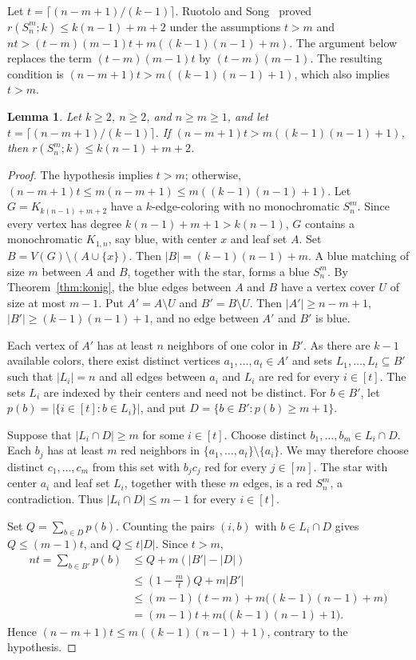 \documentclass[11pt]{article}
\newtheorem{lemma}[theorem]{Lemma}
\theoremstyle{definition}
\theoremstyle{remark}
\begin{document}
Let \(t=\lceil(n-m+1)/(k-1)\rceil\). Ruotolo and
Song~\cite[Theorem~3.3]{RuotoloSong} proved
\(r(S_n^m;k)\le k(n-1)+m+2\) under the assumptions \(t>m\)
and \(nt>(t-m)(m-1)t+m((k-1)(n-1)+m)\).
The argument below replaces the term \((t-m)(m-1)t\) by
\((t-m)(m-1)\). The resulting condition is
\((n-m+1)t>m((k-1)(n-1)+1)\), which also implies \(t>m\).

\begin{lemma}\label{lem:subdivided-upper}
Let \(k\ge2\), \(n\ge2\), and \(n\ge m\ge1\), and let
\(t=\lceil(n-m+1)/(k-1)\rceil\). If
\((n-m+1)t>m((k-1)(n-1)+1)\), then
\(r(S_n^m;k)\le k(n-1)+m+2\).
\end{lemma}

\begin{proof}
The hypothesis implies \(t>m\); otherwise,
\((n-m+1)t\le m(n-m+1)\le m((k-1)(n-1)+1)\).
Let \(G=K_{k(n-1)+m+2}\) have a \(k\)-edge-coloring with no
monochromatic \(S_n^m\). Since every vertex has degree
\(k(n-1)+m+1>k(n-1)\), \(G\) contains a monochromatic
\(K_{1,n}\), say blue, with center \(x\) and leaf set \(A\).
Set \(B=V(G)\setminus(A\cup\{x\})\). Then
\(|B|=(k-1)(n-1)+m\). A blue matching of size \(m\) between
\(A\) and \(B\), together with the star, forms a blue \(S_n^m\).
By Theorem~\ref{thm:konig}, the blue edges between \(A\) and \(B\)
have a vertex cover \(U\) of size at most \(m-1\). Put
\(A'=A\setminus U\) and \(B'=B\setminus U\). Then
\(|A'|\ge n-m+1\), \(|B'|\ge(k-1)(n-1)+1\), and no edge
between \(A'\) and \(B'\) is blue.

Each vertex of \(A'\) has at least \(n\) neighbors of one color
in \(B'\). As there are \(k-1\) available colors, there exist
distinct vertices \(a_1,\ldots,a_t\in A'\) and sets
\(L_1,\ldots,L_t\subseteq B'\) such that \(|L_i|=n\) and all
edges between \(a_i\) and \(L_i\) are red for every \(i\in[t]\).
The sets \(L_i\) are indexed by their centers and need not be
distinct. For \(b\in B'\), let
\(p(b)=|\{i\in[t]:b\in L_i\}|\), and put
\(D=\{b\in B':p(b)\ge m+1\}\).

Suppose that \(|L_i\cap D|\ge m\) for some \(i\in[t]\).
Choose distinct \(b_1,\ldots,b_m\in L_i\cap D\). Each \(b_j\)
has at least \(m\) red neighbors in
\(\{a_1,\ldots,a_t\}\setminus\{a_i\}\). We may therefore
choose distinct \(c_1,\ldots,c_m\) from this set with \(b_jc_j\)
red for every \(j\in[m]\). The star with center \(a_i\) and
leaf set \(L_i\), together with these \(m\) edges, is a red
\(S_n^m\), a contradiction. Thus \(|L_i\cap D|\le m-1\)
for every \(i\in[t]\).

Set \(Q=\sum_{b\in D}p(b)\). Counting the pairs \((i,b)\) with
\(b\in L_i\cap D\) gives \(Q\le(m-1)t\), and
\(Q\le t|D|\). Since \(t>m\),
\begin{align*}
 nt=\sum_{b\in B'}p(b)
 &\le Q+m(|B'|-|D|)\\
 &\le \left(1-\frac mt\right)Q+m|B'|\\
 &\le (m-1)(t-m)+m\bigl((k-1)(n-1)+m\bigr)\\
 &= (m-1)t+m\bigl((k-1)(n-1)+1\bigr).
\end{align*}
Hence \((n-m+1)t\le m((k-1)(n-1)+1)\), contrary to the
hypothesis.
\end{proof}
\end{document}
